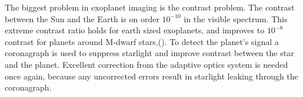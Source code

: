 The biggest problem in exoplanet imaging is the contrast problem. The contrast between the Sun and the Earth is on order $10^{-10}$ in the visible spectrum. This extreme contrast ratio holds for earth sized exoplanets, and improves to $10^{-8}$ contrast for planets around M-dwarf stars,(\cite{males2014direct}). To detect the planet's signal a coronagraph is used to suppress starlight and improve contrast between the star and the planet. Excellent correction from the adaptive optics system is needed once again, because any uncorrected errors result in starlight leaking through the coronagraph.








%  
%

